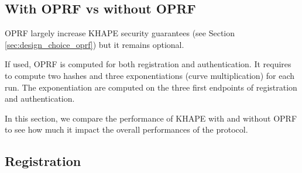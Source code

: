 \documentclass[../report.tex]{subfiles}
\begin{document}




\subsection{With OPRF vs without OPRF} %

OPRF largely increase KHAPE security guarantees (see Section \ref{sec:design_choice_oprf}) but it remains optional.

If used, OPRF is computed for both registration and authentication.
It requires to compute two hashes and three exponentiations (curve multiplication) for each run. The exponentiation are computed on the three first endpoints of registration and authentication.

In this section, we compare the performance of KHAPE with and without OPRF to see how much it impact the overall performances of the protocol.


\subsection*{Registration}
\end{document}
